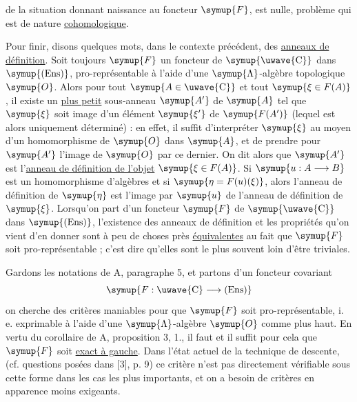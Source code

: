 de la situation donnant naissance au foncteur $\symup{F}$, est nulle, problème qui est
de nature \uline{cohomologique}.

Pour finir, disons quelques mots, dans le contexte précédent, des \uline{anneaux de définition}. Soit toujours $\symup{F}$ un foncteur de $\symup{\text{\uwave{C}}}$ dans
$\symup{(\operatorname{Ens})}$, pro-représentable à l'aide d'une $\symup{\Lambda}$-algèbre
topologique $\symup{O}$. Alors pour tout $\symup{A\in\text{\uwave{C}}}$ et tout $\symup{\xi\in F(A)}$, il
existe un \uline{plus petit} sous-anneau $\symup{A'}$ de $\symup{A}$ tel que $\symup{\xi}$ soit image d'un
élément $\symup{\xi'}$ de $\symup{F(A')}$ (lequel est alors uniquement déterminé) : en effet,
il suffit d'interpréter $\symup{\xi}$ au moyen d'un homomorphisme de $\symup{O}$ dans $\symup{A}$, et
de prendre pour $\symup{A'}$ l'image de $\symup{O}$ par ce dernier. On dit alors que $\symup{A'}$ est
l'\uline{anneau de définition de l'objet} $\symup{\xi\in F(A)}$. Si
$\symup{u:A\longrightarrow B}$ est un homomorphisme d'algèbres et si
$\symup{\eta=F(u)(\xi)}$, alors l'anneau de définition de $\symup{\eta}$ est l'image par $\symup{u}$ de
l'anneau de définition de $\symup{\xi}$. Lorsqu'on part d'un foncteur $\symup{F}$ de
$\symup{\text{\uwave{C}}}$ dans $\symup{(\operatorname{Ens})}$, l'existence des anneaux de définition
et les propriétés qu'on vient d'en donner sont à peu de choses près \uline{équivalentes} au fait que $\symup{F}$ soit pro-représentable ; c'est dire qu'elles sont
le plus souvent loin d'être triviales.


Gardons les notations de A, paragraphe 5, et partons d'un foncteur covariant
\[
  \symup{F:\text{\uwave{C}}\longrightarrow(\operatorname{Ens})}
\]
on cherche des critères maniables pour que $\symup{F}$ soit pro-représentable, i. e.
exprimable à l'aide d'une $\symup{\Lambda}$-algèbre $\symup{O}$ comme plus haut. En vertu du
corollaire de A, proposition 3, 1., il faut et il suffit pour cela que $\symup{F}$ soit
\uline{exact à gauche}. Dans l'état actuel de la technique de descente, (cf. questions
posées dans [3], p. 9) ce critère n'est pas directement vérifiable sous cette
forme dans les cas les plus importants, et on a besoin de critères en apparence
moins exigeants.

